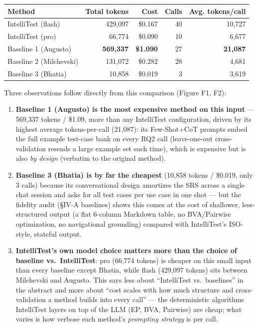 \documentclass[
]{article}
\newcounter{none} %
\providecommand{\tightlist}{%
  \setlength{\itemsep}{0pt}\setlength{\parskip}{0pt}}
\begin{document}
{\def\LTcaptype{none} %
\begin{longtable}[]{@{}lrrrr@{}}
\toprule\noalign{}
Method & Total tokens & Cost & Calls & Avg. tokens/call \\
\midrule\noalign{}
\endhead
\bottomrule\noalign{}
\endlastfoot
IntelliTest (flash) & 429,097 & \$0.167 & 40 & 10,727 \\
IntelliTest (pro) & 66,774 & \$0.090 & 10 & 6,677 \\
Baseline 1 (Augusto) & \textbf{569,337} & \textbf{\$1.090} & 27 &
\textbf{21,087} \\
Baseline 2 (Milchevski) & 131,072 & \$0.282 & 28 & 4,681 \\
Baseline 3 (Bhatia) & 10,858 & \$0.019 & 3 & 3,619 \\
\end{longtable}
}

Three observations follow directly from this comparison (Figure F1, F2):

\begin{enumerate}
\def\labelenumi{\arabic{enumi}.}
\tightlist
\item
  \textbf{Baseline 1 (Augusto) is the most expensive method on this
  input} --- 569,337 tokens / \$1.09, more than any IntelliTest
  configuration, driven by its highest average tokens-per-call (21,087):
  its Few-Shot+CoT prompts embed the full example test-case bank on
  every RQ2 call (leave-one-out cross-validation resends a large example
  set each time), which is expensive but is also \emph{by design}
  (verbatim to the original method).
\item
  \textbf{Baseline 3 (Bhatia) is by far the cheapest} (10,858 tokens /
  \$0.019, only 3 calls) because its conversational design amortizes the
  SRS across a single chat session and asks for all test cases per use
  case in one shot --- but the fidelity audit (§IV-A baselines) shows
  this comes at the cost of shallower, less-structured output (a flat
  6-column Markdown table, no BVA/Pairwise optimization, no navigational
  grounding) compared with IntelliTest's ISO-style, stateful output.
\item
  \textbf{IntelliTest's own model choice matters more than the choice of
  baseline vs.~IntelliTest}: pro (66,774 tokens) is cheaper on this
  small input than every baseline except Bhatia, while flash (429,097
  tokens) sits between Milchevski and Augusto. This says less about
  ``IntelliTest vs.~baselines'' in the abstract and more about ``cost
  scales with how much structure and cross-validation a method builds
  into every call'' --- the deterministic algorithms IntelliTest layers
  on top of the LLM (EP, BVA, Pairwise) are cheap; what varies is how
  verbose each method's \emph{prompting strategy} is per call.
\end{enumerate}
\end{document}
